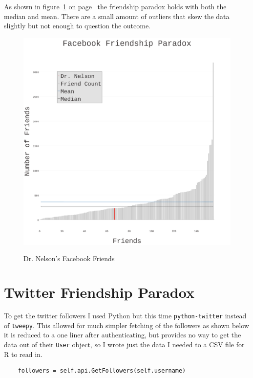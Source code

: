 \documentclass[12pt, a4paper]{article}
\newcommand{\code}[1]{\texttt{#1}}
\begin{document}
\noindent
As shown in figure~\ref{fig:friends} on page~\pageref{fig:friends} the
friendship paradox holds with both the median and mean. There are a small
amount of outliers that skew the data slightly but not enough to question
the outcome.

\begin{figure}[p]
    \centering
    \href{http://datenstrom.gitlab.io/cs532-s17/notebooks/friends.html}{
    \includegraphics[width=\textwidth]{dia/friends.png}
    }
    \caption{Dr. Nelson's Facebook Friends}
    \label{fig:friends}
\end{figure}


\section{Twitter Friendship Paradox}

To get the twitter followers I used Python but this time \code{python-twitter}
instead of \code{tweepy}. This allowed for much simpler fetching of the followers 
as shown below it is reduced to a one liner after authenticating,
but provides no way to get the data out of their \code{User} object, so I wrote
just the data I needed to a CSV file for R to read in.

\begin{minipage}{\linewidth} %
\vspace{2em}
\begin{verbatim}
    followers = self.api.GetFollowers(self.username)
\end{verbatim}
\vspace{2em}
\end{minipage}
\end{document}
